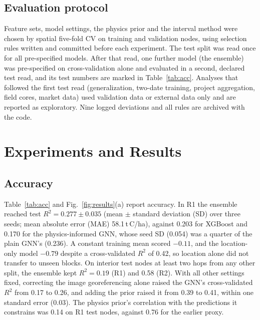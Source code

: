 \documentclass[conference]{IEEEtran}
\begin{document}
\subsection{Evaluation protocol}
Feature sets, model settings, the physics prior and the interval method were chosen by spatial five-fold CV on training and validation nodes, using selection rules written and committed before each experiment.
The test split was read once for all pre-specified models.
After that read, one further model (the ensemble) was pre-specified on cross-validation alone and evaluated in a second, declared test read, and its test numbers are marked in Table~\ref{tab:acc}.
Analyses that followed the first test read (generalization, two-date training, project aggregation, field cores, market data) used validation data or external data only and are reported as exploratory.
Nine logged deviations and all rules are archived with the code.

\section{Experiments and Results}

\subsection{Accuracy}
Table~\ref{tab:acc} and Fig.~\ref{fig:results}(a) report accuracy.
In R1 the ensemble reached test $R^2=0.277\pm0.035$ (mean $\pm$ standard deviation (SD) over three seeds; mean absolute error (MAE) 58.1\,t\,C/ha), against 0.203 for XGBoost and 0.170 for the physics-informed GNN, whose seed SD (0.054) was a quarter of the plain GNN's (0.236).
A constant training mean scored $-0.11$, and the location-only model $-0.79$ despite a cross-validated $R^2$ of 0.42, so location alone did not transfer to unseen blocks.
On interior test nodes at least two hops from any other split, the ensemble kept $R^2=0.19$ (R1) and 0.58 (R2).
With all other settings fixed, correcting the image georeferencing alone raised the GNN's cross-validated $R^2$ from 0.17 to 0.26, and adding the prior raised it from 0.39 to 0.41, within one standard error (0.03).
The physics prior's correlation with the predictions it constrains was 0.14 on R1 test nodes, against 0.76 for the earlier proxy.
\end{document}
